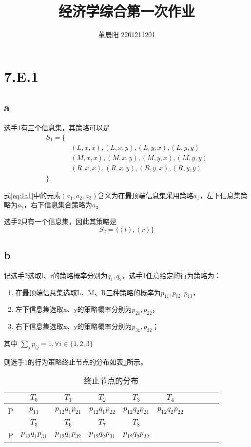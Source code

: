 \documentclass[a4paper,12pt]{article}
\title{经济学综合第一次作业}
\author{董晨阳 2201211201}
\begin{document}
\maketitle
\section{7.E.1}
\subsection{a}

选手1有三个信息集，其策略可以是
\begin{eqnarray}
    S_1=\{&\nonumber\\
    &(L,x,x),(L,x,y),(L,y,x),(L,y,y)\nonumber\\
    &(M,x,x),(M,x,y),(M,y,x),(M,y,y)\nonumber\\
    &(R,x,x),(R,x,y),(R,y,x),(R,y,y)\nonumber\\
    \}&
    \label{eq:1a1}
\end{eqnarray}

式\ref{eq:1a1}中的元素$(a_1,a_2,a_3)$含义为在最顶端信息集采用策略$a_1$，左下信息集策略为$a_2$，右下信息集合策略为$a_3$

选手2只有一个信息集，因此其策略是
\begin{equation}
    S_2=\{ (l),(r) \}
\end{equation}

\subsection{b}\label{sec:1.2}

记选手2选取l、r的策略概率分别为$q_1,q_2$，选手1任意给定的行为策略为：
\begin{enumerate}
    \item 在最顶端信息集选取L、M、R三种策略的概率为$p_{11},p_{12},p_{13}$，
    \item 左下信息集选取x、y的策略概率分别为$p_{21},p_{22}$，
    \item 右下信息集选取x、y的策略概率分别为$p_{31},p_{32}$；
\end{enumerate}
其中 $\sum_j p_{ij}=1,\forall i\in\{ 1,2,3 \}$

则选手1的行为策略终止节点的分布如表\ref{tab:1b1}所示。
\begin{table}[H]
    \centering
    \begin{tabular}{cccccccccc}
          & $T_0$             & $T_1$             & $T_2$             & $T_3$             & $T_4$             \\\hline
        P & $p_{11}$          & $p_{12}q_1p_{21}$ & $p_{12}q_1p_{22}$ & $p_{12}q_2p_{21}$ & $p_{12}q_2p_{22}$ \\\hline
          & $T_5$             & $T_6$             & $T_7$             & $T_8$             &                   \\\hline
        P & $p_{12}q_1p_{31}$ & $p_{12}q_1p_{32}$ & $p_{12}q_2p_{31}$ & $p_{12}q_2p_{32}$ &                   \\\hline
    \end{tabular}
    \caption{终止节点的分布}\label{tab:1b1}
\end{table}
\end{document}
